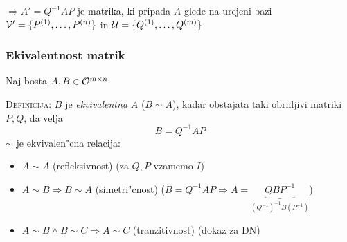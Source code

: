 $\Rightarrow A' = Q^{-1}AP$ je matrika, ki pripada $A$ glede na urejeni bazi $\mathcal{V}' = \{P^{(1)}, \ldots, P^{(n)}\}$ in $\mathcal{U} = \{Q^{(1)}, \ldots, Q^{(m)}\}$
%
\subsubsection{Ekivalentnost matrik}
Naj bosta $A, B \in \mathcal{O}^{m \times n}$

\textsc{Definicija:} $B$ je \emph{ekvivalentna} $A$ ($B \sim A$), kadar obstajata taki obrnljivi matriki $P, Q$, da velja
\begin{equation*}
B = Q^{-1}AP
\end{equation*}
%
$\sim$ je ekvivalen"cna relacija:
\begin{itemize}
	\item $A \sim A$ (refleksivnost) (za $Q, P$ vzamemo $I$)
	\item $A \sim B \Rightarrow B \sim A$ (simetri"cnost) ($B = Q^{-1}AP \Rightarrow A = \underbrace{QBP^{-1}}_{(Q^{-1})^{-1}B(P^{-1})}$)
	\item $A \sim B \land B \sim C \Rightarrow A \sim C$ (tranzitivnost) (dokaz za DN)
\end{itemize}